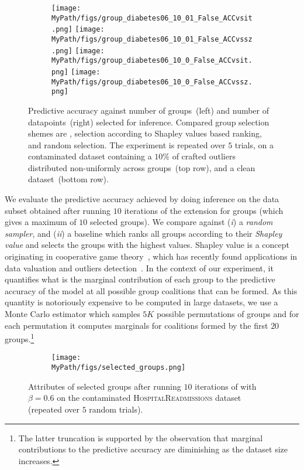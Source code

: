 \begin{figure}[t!]
	\begin{subfigure}[b]{0.9\textwidth} 
		\centering
		\texttt{[image: \\MyPath/figs/group\_diabetes06\_10\_01\_False\_ACCvsit.png]}
		\hfill
		\texttt{[image: \\MyPath/figs/group\_diabetes06\_10\_01\_False\_ACCvssz.png]}
		\centering
		\hfill
		\texttt{[image: \\MyPath/figs/group\_diabetes06\_10\_0\_False\_ACCvsit.png]}
		\centering
		\hfill
		\texttt{[image: \\MyPath/figs/group\_diabetes06\_10\_0\_False\_ACCvssz.png]}
	\end{subfigure}	
	\centering
	\caption{Predictive accuracy against number of groups~(left) and number of datapoints~(right) selected for inference. Compared group selection shemes are \bcores{}, selection according to Shapley values based ranking, and random selection. The experiment is repeated over $5$ trials, on a contaminated dataset containing a $10\%$ of crafted outliers distributed non-uniformly across groups~(top row), and a clean dataset~(bottom row).}
	\label{fig:group_plot}
\end{figure}


We evaluate the predictive accuracy achieved by doing inference on the data subset obtained after running $10$ iterations of the \bcores{} extension for groups (which gives a maximum of $10$ selected groups). We compare against (\emph{i}) a \emph{random sampler}, and (\emph{ii}) a baseline which ranks all groups according to their \emph{Shapley value} and selects the groups with the highest values. Shapley value is a concept originating in cooperative game theory~\citep{shapley53}, which has recently found applications in data valuation and outliers detection~\cite{ghorbani19}. In the context of our experiment, it quantifies what is the marginal contribution of each group to the predictive accuracy of the model at all possible group coalitions that can be formed. As this quantity is notoriously expensive to be computed in large datasets, we use a Monte Carlo estimator which samples $5K$ possible permutations of groups and for each permutation it computes marginals for coalitions formed by the first $20$ groups.\footnote{The latter truncation is supported by the observation that marginal contributions to the predictive accuracy are diminishing as the dataset size increases.}

\begin{figure}[t!]
	\begin{subfigure}[b]{.8\textwidth} 
		\centering
		\texttt{[image: \\MyPath/figs/selected\_groups.png]}
	\end{subfigure}	
	\centering
	\caption{Attributes of selected groups after running $10$ iterations of \bcores{} with $\beta=0.6$ on the contaminated \textsc{HospitalReadmissions} dataset (repeated over $5$ random trials).}
	\label{fig:selected_groups}
\end{figure}

